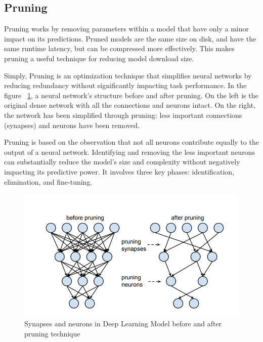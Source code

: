\subsection{Pruning}
Pruning works by removing parameters within a model that have only a minor impact on its predictions. Pruned models are the same size on disk, and have the same runtime latency, but can be compressed more effectively. This makes pruning a useful technique for reducing model download size. \cite{tfl_Opt:2024}

Simply, Pruning is an optimization technique that simplifies neural networks by reducing redundancy without significantly impacting task performance. In the figure ~\ref{Pruning}, a neural network’s structure before and after pruning. On the left is the original dense network with all the connections and neurons intact. On the right, the network has been simplified through pruning: less important connections (synapses) and neurons have been removed.

Pruning is based on the observation that not all neurons contribute equally to the output of a neural network. Identifying and removing the less important neurons can substantially reduce the model’s size and complexity without negatively impacting its predictive power. It involves three key phases: identification, elimination, and fine-tuning. \cite{deeplearningOptimizationMethods:2024}

\begin{figure}
	\begin{center}
		\includegraphics[width=0.7\linewidth]{Images/TensorFlowLite/Pruning.png}
		\caption{Synapses and neurons in Deep Learning Model before and after pruning technique}
		\label{Pruning}
	\end{center}
\end{figure}

